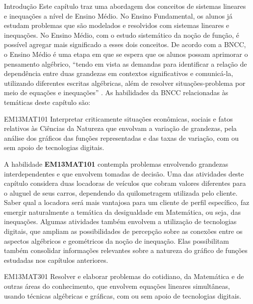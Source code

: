 \mainmatter

\begin{apresentacao}{Introdução}
Este capítulo traz uma abordagem dos conceitos de sistemas lineares e inequações a nível de Ensino Médio. No Ensino Fundamental, os alunos já estudam problemas que são modelados e resolvidos com sistemas lineares e inequações. No Ensino Médio, com o estudo sistemático da noção de função, é possível agregar mais significado a esses dois conceitos. De acordo com a BNCC, o Ensino Médio é uma etapa em que se espera que os alunos possam aprimorar o pensamento algébrico, “tendo em vista as demandas para identificar a relação de dependência entre duas grandezas em contextos significativos e comunicá-la, utilizando diferentes escritas algébricas, além de resolver situações-problema por meio de equações e inequações”{} \citep{BNCC2018}. 
As habilidades da BNCC relacionadas às temáticas deste capítulo são:


\begin{habilities}{EM13MAT101}
Interpretar criticamente situações econômicas, sociais e fatos relativos às Ciências da Natureza que envolvam a variação de grandezas, pela análise dos gráficos das funções representadas e das taxas de variação, com ou sem apoio de tecnologias digitais.
\end{habilities}

A habilidade \textbf{EM13MAT101} contempla problemas envolvendo grandezas interdependentes e que envolvem tomadas de decisão. Uma das atividades deste capítulo considera duas locadoras de veículos que cobram valores diferentes para o aluguel de seus carros, dependendo da quilometragem utilizada pelo cliente. Saber qual a locadora será mais vantajosa para um cliente de perfil específico, faz emergir naturalmente a temática da desigualdade em Matemática, ou seja, das inequações. Algumas atividades também envolvem a utilização de tecnologias digitais, que ampliam as possibilidades de percepção sobre as conexões entre os aspectos algébricos e geométricos da noção de inequação. Elas possibilitam também consolidar informações relevantes sobre a natureza do gráfico de funções estudadas nos capítulos anteriores.



\begin{habilities}{EM13MAT301}
Resolver e elaborar problemas do cotidiano, da Matemática e de outras áreas do conhecimento, que envolvem equações lineares simultâneas, usando técnicas algébricas e gráficas, com ou sem apoio de tecnologias digitais.
\end{habilities}


\end{apresentacao}
